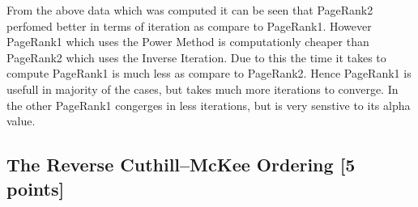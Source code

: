 \documentclass[unicode,11pt,a4paper,oneside,numbers=endperiod,openany]{scrartcl}
\begin{document}
From the above data which was computed it can be seen that PageRank2 perfomed better in terms of iteration as compare to PageRank1. However PageRank1 which uses the Power Method is computationly cheaper than PageRank2 which uses the Inverse Iteration. Due to this the time it takes to compute PageRank1 is much less as compare to PageRank2. Hence PageRank1 is usefull in majority of the cases, but takes much more iterations to converge. In the other PageRank1 congerges in less iterations, but is very senstive to its alpha value. \\

\subsection{The Reverse Cuthill--McKee Ordering [5 points]}
\end{document}
